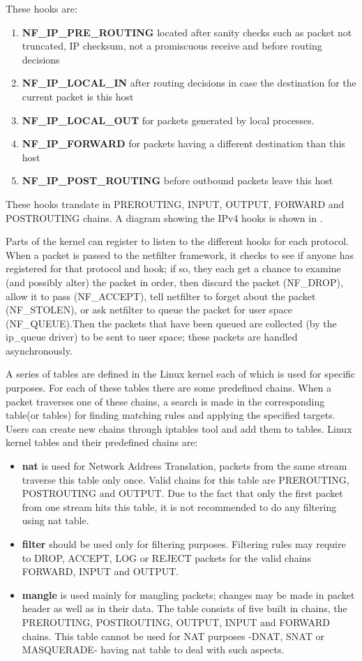 {{These hooks are:
\begin{enumerate}
\item \textbf{NF_IP_PRE_ROUTING} located after sanity checks such as packet not truncated, IP checksum, 
not a promiscuous receive and before routing decisions 
\item \textbf{NF_IP_LOCAL_IN} after routing decisions in case the destination for the current packet 
is this host
\item \textbf{NF_IP_LOCAL_OUT} for packets generated by local processes. 
\item \textbf{NF_IP_FORWARD} for packets having a different destination than this host
\item \textbf{NF_IP_POST_ROUTING} before outbound packets leave this host 
\end{enumerate}
These hooks translate in PREROUTING, INPUT, OUTPUT, FORWARD and POSTROUTING chains.
A diagram showing the IPv4 hooks is shown in .

Parts of the kernel can register to listen to the different hooks for each protocol. When a packet is 
passed to the netfilter framework, it checks to see if anyone has registered for that protocol and hook; 
if so, they each get a chance to examine (and possibly alter) the packet in order, then discard the packet 
(NF_DROP), allow it to pass (NF_ACCEPT), tell netfilter to forget about the packet (NF_STOLEN), or ask 
netfilter to queue the packet for user space (NF_QUEUE).Then the packets that have been queued are collected 
(by the ip_queue driver) to be sent to user space; these packets are handled asynchronously.

A series of tables are defined in the Linux kernel each of which is used for specific purposes. For each of 
these tables there are some predefined chains. When a packet traverses one of these chains, a search is made 
in the corresponding table(or tables) for finding matching rules and applying the specified targets. Users can 
create new chains through iptables tool and add them to tables.
Linux kernel tables and their predefined chains are:       
\begin{itemize}
\item {\bf nat} is used for Network Address Translation, packets from the same stream traverse this table only 
once. Valid chains for this table are PREROUTING, POSTROUTING and OUTPUT. Due to the fact that only the first 
packet from one stream hits this table, it is not recommended to do any filtering using nat table.
\item {\bf filter} should be used only for filtering purposes. Filtering rules may require to DROP, ACCEPT, LOG or 
REJECT packets for the valid chains FORWARD, INPUT and OUTPUT.
\item {\bf mangle} is used mainly for mangling packets; changes may be made in packet header as well as in their data. 
The table consists of five built in chains, the PREROUTING, POSTROUTING, OUTPUT, INPUT and FORWARD chains. This table cannot 
be used for NAT purposes -DNAT, SNAT or MASQUERADE- having nat table to deal with such aspects. 
\end{itemize}

}}
